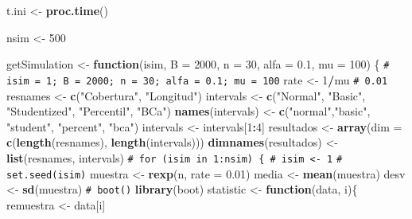 \documentclass[
]{book}
\newenvironment{Shaded}{\begin{snugshade}}{\end{snugshade}}
\newcommand{\AttributeTok}[1]{\textcolor[rgb]{0.13,0.29,0.53}{#1}}
\newcommand{\CommentTok}[1]{\textcolor[rgb]{0.56,0.35,0.01}{\textit{#1}}}
\newcommand{\ControlFlowTok}[1]{\textcolor[rgb]{0.13,0.29,0.53}{\textbf{#1}}}
\newcommand{\DecValTok}[1]{\textcolor[rgb]{0.00,0.00,0.81}{#1}}
\newcommand{\FloatTok}[1]{\textcolor[rgb]{0.00,0.00,0.81}{#1}}
\newcommand{\FunctionTok}[1]{\textcolor[rgb]{0.13,0.29,0.53}{\textbf{#1}}}
\newcommand{\NormalTok}[1]{#1}
\newcommand{\OtherTok}[1]{\textcolor[rgb]{0.56,0.35,0.01}{#1}}
\newcommand{\SpecialCharTok}[1]{\textcolor[rgb]{0.81,0.36,0.00}{\textbf{#1}}}
\newcommand{\StringTok}[1]{\textcolor[rgb]{0.31,0.60,0.02}{#1}}
\theoremstyle{break}
\theoremstyle{nonumberplain}
\renewcommand{\CommentTok}[1]{\textcolor[rgb]{0.41,0.41,0.41}{\texttt{#1}}}
\begin{document}
\begin{Shaded}
\begin{Highlighting}[]
\NormalTok{t.ini }\OtherTok{\textless{}{-}} \FunctionTok{proc.time}\NormalTok{()}

\NormalTok{nsim }\OtherTok{\textless{}{-}} \DecValTok{500}

\NormalTok{getSimulation }\OtherTok{\textless{}{-}} \ControlFlowTok{function}\NormalTok{(isim, }\AttributeTok{B =} \DecValTok{2000}\NormalTok{, }\AttributeTok{n =} \DecValTok{30}\NormalTok{, }\AttributeTok{alfa =} \FloatTok{0.1}\NormalTok{, }\AttributeTok{mu =} \DecValTok{100}\NormalTok{) \{}
    \CommentTok{\# isim = 1; B = 2000; n = 30; alfa = 0.1; mu = 100}
\NormalTok{    rate }\OtherTok{\textless{}{-}} \DecValTok{1}\SpecialCharTok{/}\NormalTok{mu }\CommentTok{\# 0.01}
\NormalTok{    resnames }\OtherTok{\textless{}{-}} \FunctionTok{c}\NormalTok{(}\StringTok{"Cobertura"}\NormalTok{, }\StringTok{"Longitud"}\NormalTok{)}
\NormalTok{    intervals }\OtherTok{\textless{}{-}} \FunctionTok{c}\NormalTok{(}\StringTok{"Normal"}\NormalTok{, }\StringTok{"Basic"}\NormalTok{, }\StringTok{"Studentized"}\NormalTok{, }\StringTok{"Percentil"}\NormalTok{, }\StringTok{"BCa"}\NormalTok{)}
    \FunctionTok{names}\NormalTok{(intervals) }\OtherTok{\textless{}{-}} \FunctionTok{c}\NormalTok{(}\StringTok{"normal"}\NormalTok{,}\StringTok{"basic"}\NormalTok{, }\StringTok{"student"}\NormalTok{, }\StringTok{"percent"}\NormalTok{, }\StringTok{"bca"}\NormalTok{)}
\NormalTok{    intervals }\OtherTok{\textless{}{-}}\NormalTok{ intervals[}\DecValTok{1}\SpecialCharTok{:}\DecValTok{4}\NormalTok{]}
\NormalTok{    resultados }\OtherTok{\textless{}{-}} \FunctionTok{array}\NormalTok{(}\AttributeTok{dim =} \FunctionTok{c}\NormalTok{(}\FunctionTok{length}\NormalTok{(resnames), }\FunctionTok{length}\NormalTok{(intervals)))}
    \FunctionTok{dimnames}\NormalTok{(resultados) }\OtherTok{\textless{}{-}} \FunctionTok{list}\NormalTok{(resnames, intervals)}
    \CommentTok{\# for (isim in 1:nsim) \{ \# isim \textless{}{-} 1}
    \CommentTok{\# set.seed(isim)}
\NormalTok{    muestra }\OtherTok{\textless{}{-}} \FunctionTok{rexp}\NormalTok{(n, }\AttributeTok{rate =} \FloatTok{0.01}\NormalTok{)}
\NormalTok{    media }\OtherTok{\textless{}{-}} \FunctionTok{mean}\NormalTok{(muestra)}
\NormalTok{    desv }\OtherTok{\textless{}{-}} \FunctionTok{sd}\NormalTok{(muestra)}
    \CommentTok{\# boot()}
    \FunctionTok{library}\NormalTok{(boot)}
\NormalTok{    statistic }\OtherTok{\textless{}{-}} \ControlFlowTok{function}\NormalTok{(data, i)\{}
\NormalTok{      remuestra }\OtherTok{\textless{}{-}}\NormalTok{ data[i]}

\end{Highlighting}
\end{Shaded}
\end{document}

